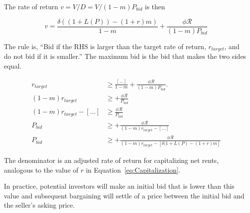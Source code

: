 The rate of return $v=V/D=V/(1-m)P_{bid}$ is then

\[v= \frac{\delta((1+L(P))- (1+r)m)}{1-m}   +\frac{\phi \mathcal{R}}{(1-m)P_{bid}}\]









The rule is, ``Bid if the RHS is larger than the target rate of return, $r_{target}$, and do not bid if it is smaller.''  The maximum bid  is the bid that makes the two sides equal. 


\begin{align}
r_{target} &\ge \frac{\left[\dots \right]}{1-m}   +\frac{\phi \mathcal{R}}{(1-m)P_{bid}}. \\
%
(1-m)r_{target} &\ge   + \frac{\phi \mathcal{R}}{P_{bid}}\\%
%
(1-m)r_{target}-\left[\dots\right]  &\ge  \frac{\phi \mathcal{R}}{P_{bid}}\\
%
P_{bid} &\ge    +\frac{\phi \mathcal{R}}{(1-m)r_{target}-\left[ \dots\right]}\\
%
P_{bid} &\ge    +\frac{\phi \mathcal{R}}{(1-m)r_{target}-\left[ \delta(1+L(P)- (1+r)m\right]}
\end{align}

The denominator is an adjusted rate of return for capitalizing net rents, analogous to the value of $r$ in Equation~\ref{eq:Capitalization}. 


In practice, potential investors will make an  initial  bid that is lower than this value and subsequent bargaining will settle of a price between the initial bid and the seller's asking price.


